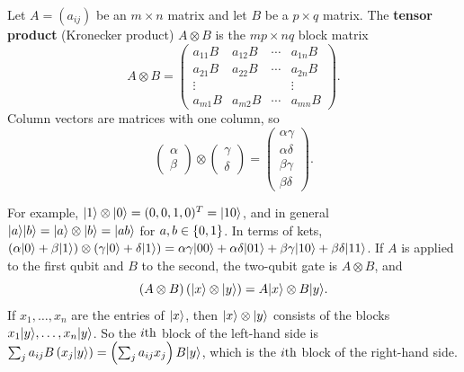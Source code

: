\begin{definition}\label{def:tensor-0915}
    Let $A = (a_{ij})$ be an $m \times n$ matrix and let $B$ be a $p \times q$ matrix. The
    \textbf{tensor product} (Kronecker product) $A \otimes B$ is the $mp \times nq$ block matrix
    \[A \otimes B = \begin{pmatrix}
            a_{11} B & a_{12} B & \cdots & a_{1n} B \\
            a_{21} B & a_{22} B & \cdots & a_{2n} B \\
            \vdots   &          &        & \vdots   \\
            a_{m1} B & a_{m2} B & \cdots & a_{mn} B
        \end{pmatrix}.\]
    Column vectors are matrices with one column, so
    \[\begin{pmatrix} \alpha \\ \beta \end{pmatrix} \otimes \begin{pmatrix} \gamma \\ \delta \end{pmatrix}
        = \begin{pmatrix} \alpha\gamma \\ \alpha\delta \\ \beta\gamma \\ \beta\delta \end{pmatrix}.\]
\end{definition}

For example, $\lvert 1 \rangle \otimes \lvert 0 \rangle = (0, 0, 1, 0)^T = \lvert 10 \rangle$, and
in general $\lvert a \rangle \lvert b \rangle = \lvert a \rangle \otimes \lvert b \rangle = \lvert a b \rangle$ for $a, b \in \left\lbrace0,1\right\rbrace$. In terms
of kets, $\left(\alpha \lvert 0 \rangle + \beta \lvert 1 \rangle\right) \otimes \left(\gamma \lvert 0 \rangle + \delta \lvert 1 \rangle\right)
    = \alpha\gamma \lvert 00 \rangle + \alpha\delta \lvert 01 \rangle + \beta\gamma \lvert 10 \rangle + \beta\delta \lvert 11 \rangle$.
If $A$ is applied to the first qubit and $B$ to the second, the two-qubit gate is $A \otimes B$, and
\begin{equation}\label{eq:mixed-0915}
    (A \otimes B)\left(\lvert x \rangle \otimes \lvert y \rangle\right) = A \lvert x \rangle \otimes B \lvert y \rangle.
\end{equation}
If $x_1, \dots, x_n$ are the entries of $\lvert x \rangle$, then $\lvert x \rangle \otimes \lvert y \rangle$ consists of
the blocks $x_1 \lvert y \rangle, \dots, x_n \lvert y \rangle$. So the $i\text{th}$ block of the left-hand side is
$\sum_{j} a_{ij} B \left(x_j \lvert y \rangle\right) = \left(\sum_j a_{ij} x_j\right) B \lvert y \rangle$, which is the
$i\text{th}$ block of the right-hand side.

